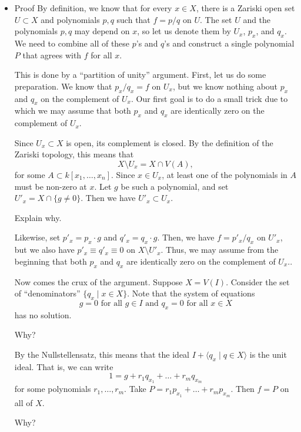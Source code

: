 \documentclass[11pt]{article}
\begin{document}
\begin{itemize}
\item Proof
\label{sec:orge34dfd0}
By definition, we know that for every \(x \in X\), there is a Zariski open set \(U \subset X\) and polynomials \(p, q\) such that \(f = p/q\) on \(U\).
The set \(U\) and the polynomials \(p, q\) may depend on \(x\), so let us denote them by \(U_x\), \(p_x\), and  \(q_x\).
We need to combine all of these \(p\)'s and \(q\)'s and construct a single polynomial \(P\) that agrees with \(f\) for all \(x\).

This is done by a ``partition of unity'' argument.
First, let us do some preparation.
We know that \(p_x / q_x = f\) on \(U_x\), but we know nothing about \(p_x\) and \(q_x\) on the complement of \(U_x\).
Our first goal is to do a small trick due to which we may assume that both \(p_x\) and \(q_x\) are identically zero on the complement of \(U_x\).

Since \(U_x \subset X\) is open, its complement is closed.
By the definition of the Zariski topology, this means that
\[X \setminus U_x = X \cap V(A),\]
for some \(A \subset k[x_1,\dots, x_n]\).
Since \(x \in U_x\), at least one of the polynomials in \(A\) must be non-zero at \(x\).
Let \(g\) be such a polynomial, and set \(U'_x = X \cap \{g \neq 0\}\).
Then we have \(U'_x \subset U_x\).
\begin{skipped}
Explain why.
\end{skipped}
Likewise, set \(p'_x = p_x \cdot g\) and \(q'_x = q_x \cdot g\).
Then, we have \(f = p'_x/q_x\) on \(U'_x\), but we also have \(p'_x \equiv q'_x \equiv 0\) on \(X \setminus U'_x\).
Thus, we may assume from the beginning that both \(p_x\) and \(q_x\) are identically zero on the complement of \(U_x\)..

Now comes the crux of the argument.
Suppose \(X = V(I)\).
Consider the set of ``denominators'' \(\{q_x \mid x \in X\}\).
Note that the system of equations
\[ g = 0 \text{ for all } g \in I \text{ and } q_x = 0 \text{ for all } x \in X\]
has no solution.
\begin{skipped}
Why?
\end{skipped}
By the Nullstellensatz, this means that the ideal \(I + \langle q_x \mid q \in X \rangle\) is the unit ideal.
That is, we can write
\[ 1 = g + r_1q_{x_1} + \dots + r_m q_{x_m}\]
for some polynomials \(r_1, \dots, r_m\).
Take \(P = r_1p_{x_1} + \dots + r_m p_{x_m}\).
Then \(f = P\) on all of \(X\).
\begin{skipped}
Why?
\end{skipped}
\end{itemize}
\end{document}
